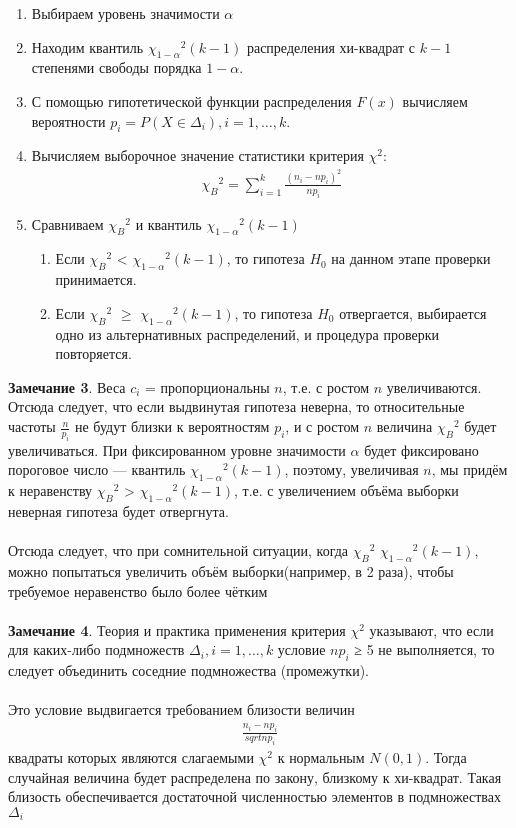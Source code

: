 \begin{enumerate}
    \item Выбираем уровень значимости $\alpha$
    \item Находим квантиль ${\chi_{1-\alpha}}^2(k-1)$ распределения
хи-квадрат с $k-1$ степенями свободы порядка $1-\alpha$. 
    \item С помощью гипотетической функции распределения $F(x)$ вычисляем вероятности $p_{i} = P(X \in \Delta_{i}), i = 1,\dots,k$.
    \item Вычисляем выборочное значение статистики критерия $\chi^2$:
    \begin{gather}
        {\chi_{B}}^2 = \sum_{i=1}^{k}\frac{(n_i - np_i)^2}{np_i}
    \end{gather}
    \item Сравниваем $ {\chi_{B}}^2$ и квантиль ${\chi_{1-\alpha}}^2(k-1)$
    \begin{enumerate}
        \item  Если ${\chi_{B}}^2$ < ${\chi_{1-\alpha}}^2(k-1)$, то гипотеза $H_0$ на данном этапе проверки принимается.
        \item Если ${\chi_{B}}^2$ $\geq$ ${\chi_{1-\alpha}}^2(k-1)$, то гипотеза $H_0$ отвергается, выбирается одно из альтернативных распределений, и процедура
проверки повторяется.
    \end{enumerate}
\end{enumerate}
\textbf{Замечание 3}. Веса $c_i$ = 
пропорциональны $n$, т.е. с ростом $n$ увеличиваются. Отсюда следует,
что если выдвинутая гипотеза неверна, то относительные частоты
$\frac{n}{p_i}$ не будут близки к вероятностям $p_i$, и с ростом $n$ величина ${\chi_{B}}^2$ будет увеличиваться. При фиксированном уровне значимости
$\alpha$ будет фиксировано пороговое число — квантиль ${\chi_{1-\alpha}}^2(k-1)$,
поэтому, увеличивая $n$, мы придём к неравенству ${\chi_{B}}^2$ > ${\chi_{1-\alpha}}^2(k-1)$,
т.е. с увеличением объёма выборки неверная гипотеза будет отвергнута. \\ \\
Отсюда следует, что при сомнительной ситуации, когда ${\chi_{B}}^2$ \approx ${\chi_{1-\alpha}}^2(k-1)$, можно попытаться увеличить объём выборки(например, в 2 раза), чтобы требуемое неравенство было более чётким \\ \\
\textbf{Замечание 4}. Теория и практика применения критерия $\chi^2$ указывают, что если для каких-либо подмножеств $\Delta_{i}, i = 1,\dots,k$ условие
$np_i$ ≥ 5 не выполняется, то следует объединить соседние подмножества (промежутки).\\ \\
Это условие выдвигается требованием близости величин
\begin{gather}
    \frac{n_i - np_i}{sqrt{np_i}}
\end{gather}
квадраты которых являются слагаемыми $\chi^2$ к нормальным $N(0,1)$.
Тогда случайная величина будет распределена по закону, близкому к хи-квадрат. Такая близость обеспечивается достаточной
численностью элементов в подмножествах $\Delta_{i}$


